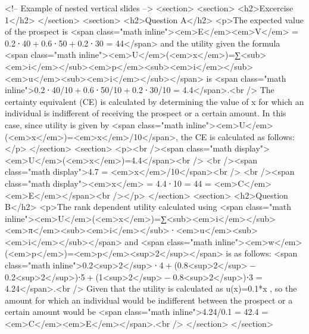 				<!-- Example of nested vertical slides -->
				<section>
					<section>
						<h2>Excercise 1</h2>
					</section>
					<section>
						<h2>Question A</h2>
						<p>The expected value of the prospect is <span class="math inline"><em>E</em><em>V</em> = 0.2 ⋅ 40 + 0.6 ⋅ 50 + 0.2 ⋅ 30 = 44</span> and the utility given the formula <span class="math inline"><em>U</em>(<em>x</em>)=∑<sub><em>i</em></sub><em>p</em><sub><em>i</em></sub><em>u</em><sub><em>i</em></sub></span> is <span class="math inline">0.2 ⋅ 40/10 + 0.6 ⋅ 50/10 + 0.2 ⋅ 30/10 = 4.4</span>.<br />
						The certainty equivalent (CE) is calculated by determining the value of x for which an individual is indifferent of receiving the prospect or a certain amount. In this case, since utility is given by <span class="math inline"><em>U</em>(<em>x</em>)=<em>x</em>/10</span>, the CE is calculated as follows:</p>
					</section>
					<section>
						<p><br /><span class="math display"><em>U</em>(<em>x</em>)=4.4</span><br /> <br /><span class="math display">4.7 = <em>x</em>/10</span><br /> <br /><span class="math display"><em>x</em> = 4.4 ⋅ 10 = 44 = <em>C</em><em>E</em></span><br /></p>
					</section>
					<section>
						<h2>Question B</h2>
						<p>The rank dependent utility calculated using <span class="math inline"><em>U</em>(<em>x</em>)=∑<sub><em>i</em></sub><em>π</em><sub><em>i</em></sub> ⋅ <em>u</em><sub><em>i</em></sub></span> and <span class="math inline"><em>w</em>(<em>p</em>)=<em>p</em><sup>2</sup></span> is as follows: <span class="math inline">0.2<sup>2</sup> ⋅ 4 + (0.8<sup>2</sup> − 0.2<sup>2</sup>)⋅5 + (1<sup>2</sup> − 0.8<sup>2</sup>)⋅3 = 4.24</span>.<br />
						Given that the utility is calculated as u(x)=0.1*x , so the amount for which an individual would be indifferent between the prospect or a certain amount would be <span class="math inline">4.24/0.1 = 42.4 = <em>C</em><em>E</em></span>.<br />
					</section>
				</section>


